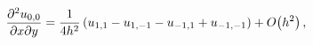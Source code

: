 \[\frac{{\partial}^{2}u_{0,0}}{\partial x\partial y}=\frac{1}{4h^{2}}\,(u_{1,1}-%
u_{1,-1}-u_{-1,1}+u_{-1,-1})+\mathop{O\/}\nolimits\!\left(h^{2}\right),\]